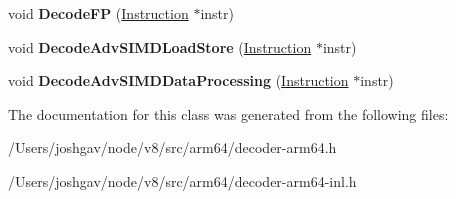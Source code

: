 \begin{DoxyCompactItemize}
\item 
void {\bfseries Decode\+FP} (\hyperlink{classv8_1_1internal_1_1_instruction}{Instruction} $\ast$instr)\hypertarget{classv8_1_1internal_1_1_decoder_aa01f5848b84fcb68109cf15a5d29a6f5}{}\label{classv8_1_1internal_1_1_decoder_aa01f5848b84fcb68109cf15a5d29a6f5}

\item 
void {\bfseries Decode\+Adv\+S\+I\+M\+D\+Load\+Store} (\hyperlink{classv8_1_1internal_1_1_instruction}{Instruction} $\ast$instr)\hypertarget{classv8_1_1internal_1_1_decoder_ac09077cf0312e2c5ec8a08409fb3fc6a}{}\label{classv8_1_1internal_1_1_decoder_ac09077cf0312e2c5ec8a08409fb3fc6a}

\item 
void {\bfseries Decode\+Adv\+S\+I\+M\+D\+Data\+Processing} (\hyperlink{classv8_1_1internal_1_1_instruction}{Instruction} $\ast$instr)\hypertarget{classv8_1_1internal_1_1_decoder_a2d03bd5bef5f5512e1a570666823b962}{}\label{classv8_1_1internal_1_1_decoder_a2d03bd5bef5f5512e1a570666823b962}

\end{DoxyCompactItemize}


The documentation for this class was generated from the following files\+:\begin{DoxyCompactItemize}
\item 
/\+Users/joshgav/node/v8/src/arm64/decoder-\/arm64.\+h\item 
/\+Users/joshgav/node/v8/src/arm64/decoder-\/arm64-\/inl.\+h\end{DoxyCompactItemize}

